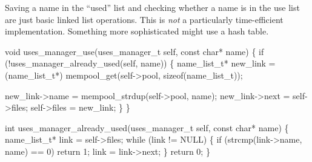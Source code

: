 Saving a name in the ``used'' list and checking whether a name
is in the use list are just basic linked list operations.
This is \emph{not} a particularly time-efficient implementation.
Something more sophisticated might use a hash table.

\nwenddocs{}\plusendmoddef\nwstartdeflinemarkup{}\nwenddeflinemarkup
void uses_manager_use(uses_manager_t self, const char* name)
\{
    if (!uses_manager_already_used(self, name)) \{
        name_list_t* new_link = (name_list_t*)
            mempool_get(self->pool, sizeof(name_list_t));

        new_link->name = mempool_strdup(self->pool, name);
        new_link->next = self->files;
        self->files = new_link;
    \}
\}

\nwendcode{}\nwdocspar

\nwenddocs{}\plusendmoddef\nwstartdeflinemarkup{}\nwenddeflinemarkup
int uses_manager_already_used(uses_manager_t self, const char* name)
\{
    name_list_t* link = self->files;
    while (link != NULL) \{
        if (strcmp(link->name, name) == 0)
            return 1;
        link = link->next;
    \}
    return 0;
\}

\nwendcode{}

